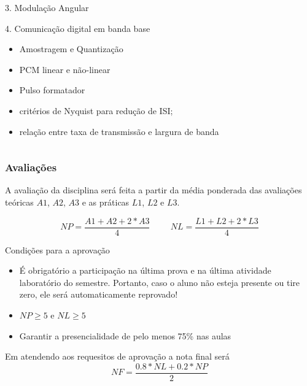 \documentclass[10pt,hyperref={pdfpagemode=FullScreen},aspectratio=169]{beamer}
\begin{document}
\begin{frame}
\begin{columns}[T]
\begin{column}{0.5\textwidth}
\begin{block}{3. Modulação Angular}
    \end{block}
  
    \begin{block}{4. Comunicação digital em banda base }
      \begin{itemize}
        \item Amostragem e Quantização
        \item PCM linear e não-linear
        \item Pulso formatador
        \item critérios de Nyquist para redução de ISI; 
        \item relação entre taxa de transmissão e largura de banda
      \end{itemize}
    \end{block}
  \end{column}
\end{columns}
  
\end{frame}



\begin{frame}
  \frametitle{Avaliações}

  A avaliação da disciplina será feita a partir da média ponderada das avaliações teóricas $A1$, $A2$, $A3$ e as práticas $L1$, $L2$ e $L3$.
  

  \begin{equation*}
      NP =  \frac{A1 + A2 + 2*A3}{4} \hspace{1cm} NL =  \frac{L1 + L2 + 2*L3}{4}
  \end{equation*}
  

  \begin{block}{Condições para a aprovação}
    \begin{itemize}
      \item É obrigatório a participação na última prova e na última atividade laboratório do semestre. Portanto, caso o aluno não esteja presente ou tire zero, ele será automaticamente reprovado!
      \item $ NP \geq 5 $ e $ NL \geq 5 $
      \item Garantir a presencialidade de pelo menos 75\% nas aulas
    \end{itemize}
  Em atendendo  aos requesitos de aprovação a nota final será
  $$
  NF = \frac{0.8*NL + 0.2*NP}{2}
  $$
  \end{block}
  
\end{frame}
\end{document}
